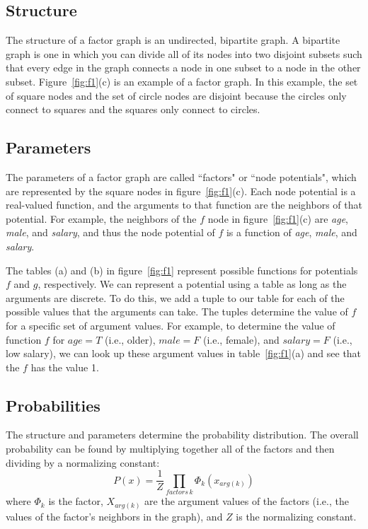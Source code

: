 \documentclass[twoside]{article}
\begin{document}
\subsection{Structure}
The structure of a factor graph is an undirected, bipartite graph.
A bipartite graph is one in which you can divide all of its nodes into two disjoint subsets such that every edge in the graph connects
a node in one subset to a node in the other subset. Figure~\ref{fig:f1}(c) is an example of a factor graph.
In this example, the set of square nodes and the set of circle nodes are disjoint because the circles only connect to squares and the squares only connect to circles.

\subsection{Parameters}
The parameters of a factor graph are called ``factors" or ``node potentials", which are represented by the square nodes in figure~\ref{fig:f1}(c). 
Each node potential is a real-valued function, and the arguments to that function are the neighbors of that potential. 
For example, the neighbors of the $f$ node in figure~\ref{fig:f1}(c) are \textit{age}, \textit{male}, and \textit{salary}, 
and thus the node potential of $f$ is a function of  \textit{age}, \textit{male}, and \textit{salary}.

The tables (a) and (b) in figure~\ref{fig:f1} represent possible functions for potentials $f$ and $g$, respectively. 
We can represent a potential using a table as long as the arguments are discrete.
To do this, we add a tuple to our table for each of the possible values that the arguments can take.
The tuples determine the value of $f$ for a specific set of argument values.
For example, to determine the value of function $f$ for $age=T$ (i.e., older), $male=F$ (i.e., female), and $salary=F$ (i.e., low salary), we can look up these argument values in table~\ref{fig:f1}(a) and see that the $f$ has the value 1.

\subsection{Probabilities}
The structure and parameters determine the probability distribution. The overall probability can be found by multiplying together all of the factors and then dividing by a normalizing constant:
\begin{equation*}
P(x)=\frac{1}{Z}\prod_{factors\,k}\Phi_k(x_{arg(k)})
\end{equation*}
where $\Phi_k$ is the factor, $X_{arg(k)}$ are the argument values of the factors (i.e., the values of the factor's neighbors in the graph), and $Z$ is the normalizing constant.
\end{document}
